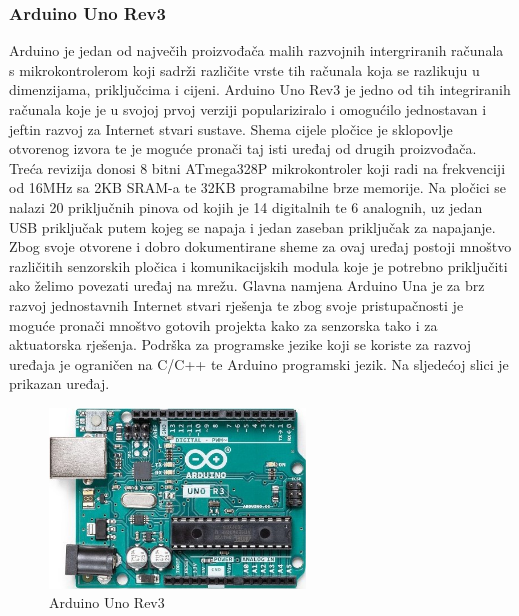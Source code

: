\documentclass[times, utf8, diplomski]{fer}
\begin{document}
\subsubsection{Arduino Uno Rev3}
Arduino je jedan od največih proizvođača malih razvojnih intergriranih računala s mikrokontrolerom koji sadrži različite vrste tih računala koja se razlikuju u dimenzijama, priključcima i cijeni. Arduino Uno Rev3\citep{ArduinoUno} je jedno od tih integriranih računala koje je u svojoj prvoj verziji populariziralo i omogućilo jednostavan i jeftin razvoj za Internet stvari sustave. Shema cijele pločice je sklopovlje otvorenog izvora te je moguće pronači taj isti uređaj od drugih proizvođača. Treća revizija donosi 8 bitni ATmega328P mikrokontroler koji radi na frekvenciji od 16MHz sa 2KB SRAM-a te 32KB programabilne brze memorije. Na pločici se nalazi 20 priključnih pinova od kojih je 14 digitalnih te 6 analognih, uz jedan USB priključak putem kojeg se napaja i jedan zaseban priključak za napajanje. Zbog svoje otvorene i dobro dokumentirane sheme za ovaj uređaj postoji mnoštvo različitih senzorskih pločica i komunikacijskih modula koje je potrebno priključiti ako želimo povezati uređaj na mrežu. Glavna namjena Arduino Una je za brz razvoj jednostavnih Internet stvari rješenja te zbog svoje pristupačnosti je moguće pronači mnoštvo gotovih projekta kako za senzorska tako i za aktuatorska rješenja. Podrška za programske jezike koji se koriste za razvoj uređaja je ograničen na C/C++ te Arduino programski jezik. Na sljedećoj slici je prikazan uređaj. 
\begin{figure}[htb]
    \centering
    \includegraphics[width=6.8cm]{images/arduinouno.jpg}
    \caption{Arduino Uno Rev3\citep{ArduinoUno}}
    \label{fig:arduinouno}
\end{figure}
\end{document}
